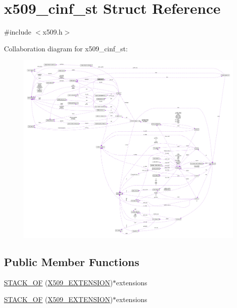 \hypertarget{structx509__cinf__st}{}\section{x509\+\_\+cinf\+\_\+st Struct Reference}
\label{structx509__cinf__st}


{\ttfamily \#include $<$x509.\+h$>$}



Collaboration diagram for x509\+\_\+cinf\+\_\+st\+:\nopagebreak
\begin{figure}[H]
\begin{center}
\leavevmode
\includegraphics[width=350pt]{structx509__cinf__st__coll__graph}
\end{center}
\end{figure}
\subsection*{Public Member Functions}
\begin{DoxyCompactItemize}
\item 
\hyperlink{structx509__cinf__st_a9674726b03b076fb4ef08b04c1417a0d}{S\+T\+A\+C\+K\+\_\+\+OF} (\hyperlink{crypto_2x509_2x509_8h_ab2f7f7dc0ced8684e0cbfc818e408304}{X509\+\_\+\+E\+X\+T\+E\+N\+S\+I\+ON})$\ast$extensions
\item 
\hyperlink{structx509__cinf__st_a9674726b03b076fb4ef08b04c1417a0d}{S\+T\+A\+C\+K\+\_\+\+OF} (\hyperlink{crypto_2x509_2x509_8h_ab2f7f7dc0ced8684e0cbfc818e408304}{X509\+\_\+\+E\+X\+T\+E\+N\+S\+I\+ON})$\ast$extensions
\end{DoxyCompactItemize}
